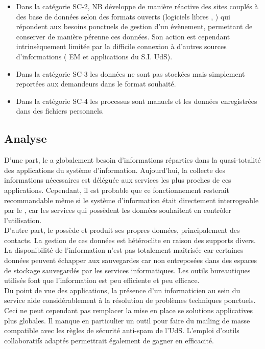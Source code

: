 \documentclass{book}
\begin{document}
\begin{itemize}
\item Dans la catégorie SC-2, NB développe de manière réactive des sites couplés 
	à des base de données selon des formats ouverts (logiciels libres , 
	) qui répondent aux besoins ponctuels de gestion d'un évènement, 
	permettant de conserver de manière pérenne ces données. Son action est 
	cependant intrinsèquement limitée par la difficile connexion à d'autres 
	sources d'informations ( EM et applications du S.I. UdS).

\item Dans la catégorie SC-3 les données ne sont pas stockées mais simplement 
	reportées aux demandeurs dans le format souhaité.

\item Dans la catégorie SC-4 les processus sont manuels et les données 
	enregistrées dans des fichiers personnels.
\end{itemize}



\subsection{Analyse}

D'une part, le \scom a globalement besoin d'informations réparties dans la 
quasi-totalité des applications du système d'information. Aujourd'hui, la 
collecte des informations nécessaires est déléguée aux services les plus 
proches de ces applications. Cependant, il est probable que ce fonctionnement 
resterait recommandable même si le système d'information était directement 
interrogeable par le \scom, car les services qui possèdent les données
souhaitent en contrôler l'utilisation.\\

D'autre part, le \scom possède et produit ses propres données, principalement 
des contacts. La gestion de ces données est hétéroclite en raison des supports 
divers. La disponibilité de l'information n'est pas totalement maîtrisée car 
certaines données peuvent échapper aux sauvegardes car non entreposées dans des 
espaces de stockage sauvegardés par les services informatiques. Les outils 
bureautiques utilisés font que l'information est peu efficiente et peu efficace.\\


Du point de vue des applications, la présence d'un informaticien au sein du 
service aide considérablement à la résolution de problèmes techniques ponctuels. 
Ceci ne peut cependant pas remplacer la mise en place se solutions applicatives 
plus globales. Il manque en particulier un outil pour faire du mailing de masse 
compatible avec les règles de sécurité anti-spam de l'UdS. L'emploi d'outils 
collaboratifs adaptés permettrait également de gagner en efficacité. 
\end{document}
